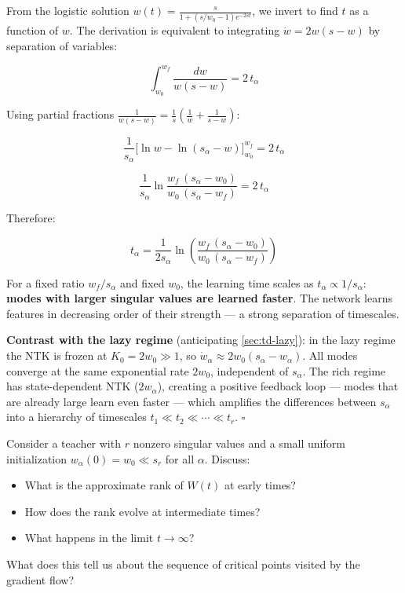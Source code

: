 \documentclass[11pt]{article}
\providecommand{\tightlist}{%
  \setlength{\itemsep}{0pt}\setlength{\parskip}{0pt}}
\begin{document}
\begin{solution}[ex:td-3b]
From the logistic solution
\(w(t) = \frac{s}{1 + (s/w_0 - 1)e^{-2st}}\), we invert to find \(t\) as
a function of \(w\). The derivation is equivalent to integrating
\(\dot{w} = 2w(s-w)\) by separation of variables:

\[\int_{w_0}^{w_f} \frac{dw}{w(s-w)} = 2\,t_\alpha\]

Using partial fractions
\(\frac{1}{w(s-w)} = \frac{1}{s}\!\left(\frac{1}{w} + \frac{1}{s-w}\right)\):

\[\frac{1}{s_\alpha}\Big[\ln w - \ln(s_\alpha - w)\Big]_{w_0}^{w_f} = 2\,t_\alpha\]

\[\frac{1}{s_\alpha}\ln\frac{w_f\,(s_\alpha - w_0)}{w_0\,(s_\alpha - w_f)} = 2\,t_\alpha\]

Therefore:

\[\boxed{t_\alpha = \frac{1}{2s_\alpha}\ln\left(\frac{w_f\,(s_\alpha - w_0)}{w_0\,(s_\alpha - w_f)}\right)}\]

For a fixed ratio \(w_f/s_\alpha\) and fixed \(w_0\), the learning time
scales as \(t_\alpha \propto 1/s_\alpha\): \textbf{modes with larger
singular values are learned faster}. The network learns features in
decreasing order of their strength --- a strong separation of
timescales.

\textbf{Contrast with the lazy regime} (anticipating \cref{sec:td-lazy}): in the
lazy regime the NTK is frozen at \(K_0 = 2w_0 \gg 1\), so
\(\dot{w}_\alpha \approx 2w_0(s_\alpha - w_\alpha)\). All modes converge
at the same exponential rate \(2w_0\), independent of \(s_\alpha\). The
rich regime has state-dependent NTK (\(2w_\alpha\)), creating a positive
feedback loop --- modes that are already large learn even faster ---
which amplifies the differences between \(s_\alpha\) into a hierarchy of
timescales \(t_1 \ll t_2 \ll \cdots \ll t_r\). \(\square\)
\end{solution}

\begin{exercise}
\label{ex:td-3c}
Consider a teacher with
\(r\) nonzero singular values and a small uniform initialization
\(w_\alpha(0) = w_0 \ll s_r\) for all \(\alpha\). Discuss:

\begin{itemize}
\tightlist
\item
  What is the approximate rank of \(W(t)\) at early times?
\item
  How does the rank evolve at intermediate times?
\item
  What happens in the limit \(t \to \infty\)?
\end{itemize}

What does this tell us about the sequence of critical points visited by
the gradient flow?
\end{exercise}
\end{document}
